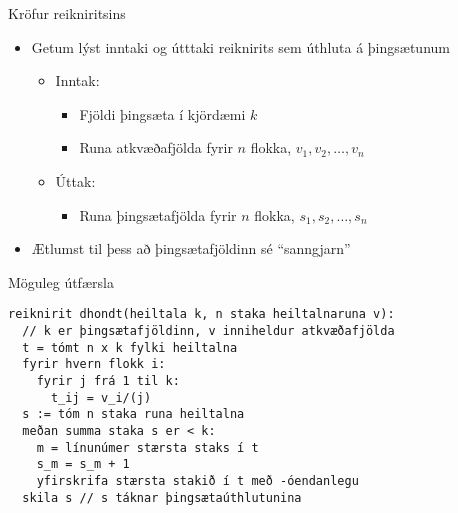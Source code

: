 \documentclass{beamer}
\begin{document}
\begin{frame}{Kröfur reikniritsins}
    \begin{itemize}
        \item Getum lýst inntaki og útttaki reiknirits sem úthluta á þingsætunum
        \begin{itemize}
            \item Inntak:
            \begin{itemize}
                \item Fjöldi þingsæta í kjördæmi $k$
                \item Runa atkvæðafjölda fyrir $n$ flokka, $v_1,v_2,\ldots,v_n$
            \end{itemize}
            \item Úttak:
            \begin{itemize}
                \item Runa þingsætafjölda fyrir $n$ flokka, $s_1, s_2, \ldots, s_n$
            \end{itemize}
        \end{itemize}
        \item Ætlumst til þess að þingsætafjöldinn sé ``sanngjarn''
    \end{itemize}
\end{frame}

\begin{frame}[fragile]{Möguleg útfærsla}
\begin{verbatim}
reiknirit dhondt(heiltala k, n staka heiltalnaruna v):
  // k er þingsætafjöldinn, v inniheldur atkvæðafjölda
  t = tómt n x k fylki heiltalna
  fyrir hvern flokk i:
    fyrir j frá 1 til k:
      t_ij = v_i/(j)
  s := tóm n staka runa heiltalna
  meðan summa staka s er < k:
    m = línunúmer stærsta staks í t
    s_m = s_m + 1
    yfirskrifa stærsta stakið í t með -óendanlegu
  skila s // s táknar þingsætaúthlutunina
\end{verbatim}
\end{frame}
\end{document}
